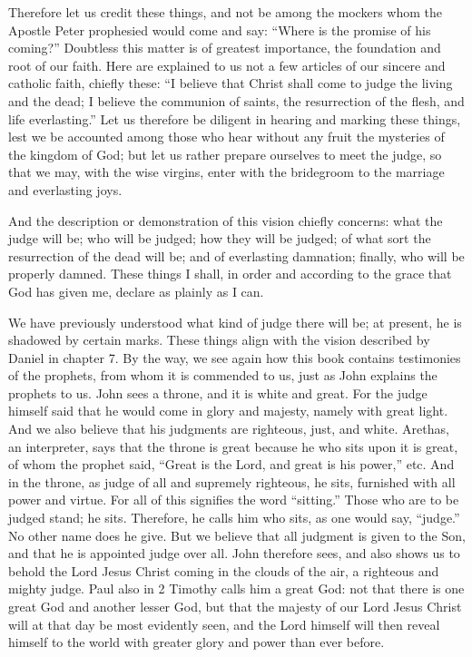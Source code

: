 Therefore let us credit these things, and not be among the mockers whom the Apostle Peter prophesied would come and say: “Where is the promise of his coming?” Doubtless this matter is of greatest importance, the foundation and root of our faith. Here are explained to us not a few articles of our sincere and catholic faith, chiefly these: “I believe that Christ shall come to judge the living and the dead; I believe the communion of saints, the resurrection of the flesh, and life everlasting.” Let us therefore be diligent in hearing and marking these things, lest we be accounted among those who hear without any fruit the mysteries of the kingdom of God; but let us rather prepare ourselves to meet the judge, so that we may, with the wise virgins, enter with the bridegroom to the marriage and everlasting joys.

And the description or demonstration of this vision chiefly concerns: what the judge will be; who will be judged; how they will be judged; of what sort the resurrection of the dead will be; and of everlasting damnation; finally, who will be properly damned. These things I shall, in order and according to the grace that God has given me, declare as plainly as I can.

We have previously understood what kind of judge there will be; at present, he is shadowed by certain marks. These things align with the vision described by Daniel in chapter 7. By the way, we see again how this book contains testimonies of the prophets, from whom it is commended to us, just as John explains the prophets to us. John sees a throne, and it is white and great. For the judge himself said that he would come in glory and majesty, namely with great light. And we also believe that his judgments are righteous, just, and white. Arethas, an interpreter, says that the throne is great because he who sits upon it is great, of whom the prophet said, “Great is the Lord, and great is his power,” etc. And in the throne, as judge of all and supremely righteous, he sits, furnished with all power and virtue. For all of this signifies the word “sitting.” Those who are to be judged stand; he sits. Therefore, he calls him who sits, as one would say, “judge.” No other name does he give. But we believe that all judgment is given to the Son, and that he is appointed judge over all. John therefore sees, and also shows us to behold the Lord Jesus Christ coming in the clouds of the air, a righteous and mighty judge. Paul also in 2 Timothy calls him a great God: not that there is one great God and another lesser God, but that the majesty of our Lord Jesus Christ will at that day be most evidently seen, and the Lord himself will then reveal himself to the world with greater glory and power than ever before.

